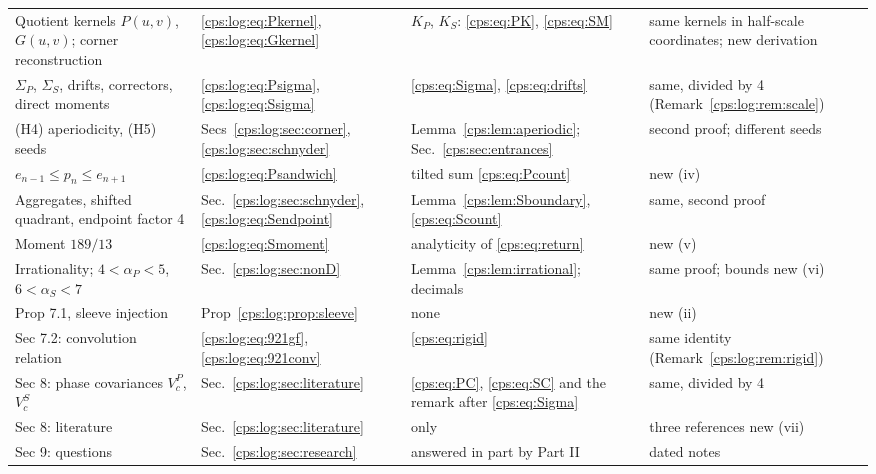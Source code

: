 \documentclass[11pt,letterpaper]{article}
\numberwithin{equation}{section}
\theoremstyle{remark}\newtheorem{remark}[theorem]{Remark}
\newcommand{\ap}{\alpha_P}\newcommand{\as}{\alpha_S}
\begin{document}
\begin{table}[htbp]
\begin{tabular}{@{}>{\raggedright}p{}>{\raggedright}p{}>{\raggedright}p{}>{\raggedright\arraybackslash}p{}@{}}
Quotient kernels $P(u,v)$, $G(u,v)$; corner reconstruction & \eqref{cps:log:eq:Pkernel}, \eqref{cps:log:eq:Gkernel} & $K_P$, $K_S$: \eqref{cps:eq:PK}, \eqref{cps:eq:SM} & same kernels in half-scale coordinates; new derivation\\
$\Sigma_P$, $\Sigma_S$, drifts, correctors, direct moments & \eqref{cps:log:eq:Psigma}, \eqref{cps:log:eq:Ssigma} & \eqref{cps:eq:Sigma}, \eqref{cps:eq:drifts} & same, divided by 4 (Remark~\ref{cps:log:rem:scale})\\
(H4) aperiodicity, (H5) seeds & Secs~\ref{cps:log:sec:corner}, \ref{cps:log:sec:schnyder} & Lemma~\ref{cps:lem:aperiodic}; Sec.~\ref{cps:sec:entrances} & second proof; different seeds\\
$e_{n-1}\le p_n\le e_{n+1}$ & \eqref{cps:log:eq:Psandwich} & tilted sum \eqref{cps:eq:Pcount} & new (iv)\\
Aggregates, shifted quadrant, endpoint factor 4 & Sec.~\ref{cps:log:sec:schnyder}, \eqref{cps:log:eq:Sendpoint} & Lemma~\ref{cps:lem:Sboundary}, \eqref{cps:eq:Scount} & same, second proof\\
Moment $189/13$ & \eqref{cps:log:eq:Smoment} & analyticity of \eqref{cps:eq:return} & new (v)\\
Irrationality; $4<\ap<5$, $6<\as<7$ & Sec.~\ref{cps:log:sec:nonD} & Lemma~\ref{cps:lem:irrational}; decimals & same proof; bounds new (vi)\\
Prop 7.1, sleeve injection & Prop~\ref{cps:log:prop:sleeve} & none & new (ii)\\
Sec 7.2: convolution relation & \eqref{cps:log:eq:921gf}, \eqref{cps:log:eq:921conv} & \eqref{cps:eq:rigid} & same identity (Remark~\ref{cps:log:rem:rigid})\\
Sec 8: phase covariances $V^P_c$, $V^S_c$ & Sec.~\ref{cps:log:sec:literature} & \eqref{cps:eq:PC}, \eqref{cps:eq:SC} and the remark after \eqref{cps:eq:Sigma} & same, divided by 4\\
Sec 8: literature & Sec.~\ref{cps:log:sec:literature} & \cite{DWrevisited} only & three references new (vii)\\
Sec 9: questions & Sec.~\ref{cps:log:sec:research} & answered in part by Part II & dated notes\\
\bottomrule
\end{tabular}
\end{table}
\end{document}
